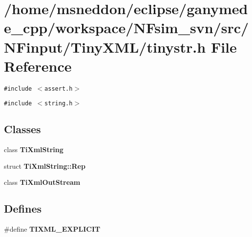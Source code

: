 \section{/home/msneddon/eclipse/ganymede\_\-cpp/workspace/NFsim\_\-svn/src/NFinput/TinyXML/tinystr.h File Reference}
\label{tinystr_8h}


{\tt \#include $<$assert.h$>$}\par
{\tt \#include $<$string.h$>$}\par
\subsection*{Classes}
\begin{CompactItemize}
\item 
class {\bf TiXmlString}
\item 
struct \textbf{TiXmlString::Rep}
\item 
class {\bf TiXmlOutStream}
\end{CompactItemize}
\subsection*{Defines}
\begin{CompactItemize}
\item 
\#define {\bf TIXML\_\-EXPLICIT}
\end{CompactItemize}
